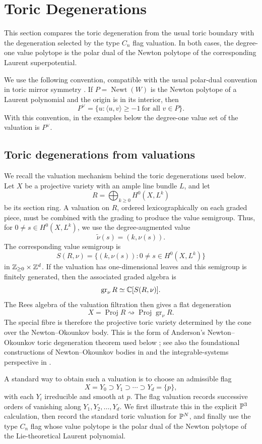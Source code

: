\section{Toric Degenerations}
This section compares the toric degeneration from the usual toric boundary with the degeneration selected by the type \(C_n\) flag valuation. In both cases, the degree-one value polytope is the polar dual of the Newton polytope of the corresponding Laurent superpotential.

We use the following convention, compatible with the usual polar-dual convention in toric mirror symmetry \cite{Bat94}. If \(P=\operatorname{Newt}(W)\) is the Newton polytope of a Laurent polynomial and the origin is in its interior, then
\[
P^\vee=\{u:\langle u,v\rangle\ge -1\ \text{for all }v\in P\}.
\]
With this convention, in the examples below the degree-one value set of the valuation is \(P^\vee\).

\subsection{Toric degenerations from valuations}
We recall the valuation mechanism behind the toric degenerations used below. Let \(X\) be a projective variety with an ample line bundle \(L\), and let
\[
R=\bigoplus_{k\ge0}H^0(X,L^k)
\]
be its section ring. A valuation on \(R\), ordered lexicographically on each graded piece, must be combined with the grading to produce the value semigroup. Thus, for \(0\ne s\in H^0(X,L^k)\), we use the degree-augmented value
\[
\widetilde\nu(s)=(k,\nu(s)).
\]
The corresponding value semigroup is
\[
S(R,\nu)=\{(k,\nu(s)):0\ne s\in H^0(X,L^k)\}
\]
in \(\mathbb{Z}_{\ge0}\times\mathbb{Z}^d\). If the valuation has one-dimensional leaves and this semigroup is finitely generated, then the associated graded algebra is
\[
\operatorname{gr}_\nu R\simeq \mathbb{C}[S(R,\nu)].
\]
The Rees algebra of the valuation filtration then gives a flat degeneration
\[
X=\operatorname{Proj}R\rightsquigarrow \operatorname{Proj}\operatorname{gr}_\nu R.
\]
The special fibre is therefore the projective toric variety determined by the cone over the Newton--Okounkov body. This is the form of Anderson's Newton--Okounkov toric degeneration theorem used below \cite{Anderson}; see also the foundational constructions of Newton--Okounkov bodies in \cite{KK,LM} and the integrable-systems perspective in \cite{HK}.

A standard way to obtain such a valuation is to choose an admissible flag
\[
X=Y_0\supset Y_1\supset\cdots\supset Y_d=\{p\},
\]
with each \(Y_i\) irreducible and smooth at \(p\). The flag valuation records successive orders of vanishing along \(Y_1,Y_2,\ldots,Y_d\). We first illustrate this in the explicit \(\mathbb{P}^3\) calculation, then record the standard toric valuation for \(\mathbb{P}^N\), and finally use the type \(C_n\) flag whose value polytope is the polar dual of the Newton polytope of the Lie-theoretical Laurent polynomial.

